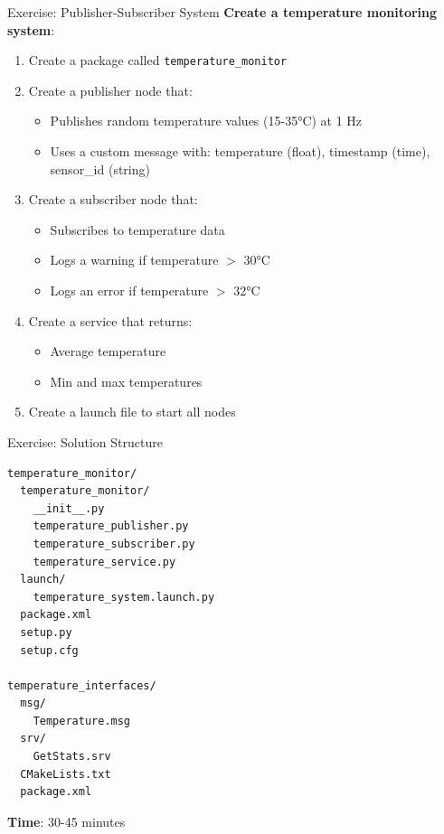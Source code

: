 \begin{frame}[fragile]{Exercise: Publisher-Subscriber System}
    \textbf{Create a temperature monitoring system}:

    \begin{enumerate}
        \item Create a package called \texttt{temperature\_monitor}

        \item Create a publisher node that:
              \begin{itemize}
                  \item Publishes random temperature values (15-35°C) at 1 Hz
                  \item Uses a custom message with: temperature (float), timestamp (time), sensor\_id (string)
              \end{itemize}

        \item Create a subscriber node that:
              \begin{itemize}
                  \item Subscribes to temperature data
                  \item Logs a warning if temperature $>$ 30°C
                  \item Logs an error if temperature $>$ 32°C
              \end{itemize}

        \item Create a service that returns:
              \begin{itemize}
                  \item Average temperature
                  \item Min and max temperatures
              \end{itemize}

        \item Create a launch file to start all nodes
    \end{enumerate}
\end{frame}

\begin{frame}[fragile]{Exercise: Solution Structure}
    \begin{lstlisting}[language=syntax]
temperature_monitor/
  temperature_monitor/
    __init__.py
    temperature_publisher.py
    temperature_subscriber.py
    temperature_service.py
  launch/
    temperature_system.launch.py
  package.xml
  setup.py
  setup.cfg

temperature_interfaces/
  msg/
    Temperature.msg
  srv/
    GetStats.srv
  CMakeLists.txt
  package.xml
\end{lstlisting}

    \textbf{Time}: 30-45 minutes
\end{frame}

